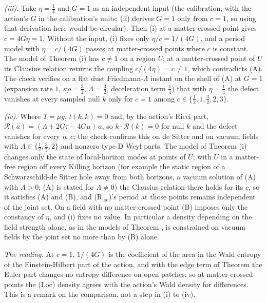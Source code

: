 \emph{(iii).} Take $\eta = \tfrac14$ and $G = 1$ as an independent input (the calibration, with the action's $G$ in the calibration's units; (ii) derives $G = 1$ only from $c = 1$, so using that derivation here would be circular). Then (i) at a matter-crossed point gives $c = 4G\eta = 1$. Without the input, (i) fixes only $\eta/c = 1/(4G)$, and a period model with $\eta = c/(4G)$ passes at matter-crossed points where $c$ is constant. The model of Theorem (i) has $c \neq 1$ on a region $U$; at a matter-crossed point of $U$ its Clausius relation returns the coupling $c/(4\eta) = c \neq 1$, which contradicts (A). The check verifies on a flat dust Friedmann-$\Lambda$ instant on the shell of (A) at $G = 1$ (expansion rate $1$, $\kappa\rho = \tfrac32$, $\Lambda = \tfrac32$, deceleration term $\tfrac14$) that with $\eta = \tfrac14$ the defect vanishes at every sampled null $k$ only for $c = 1$ among $c \in \{\tfrac12, 1, \tfrac32, 2, 3\}$.

\emph{(iv).} Where $T = \mu g$, $t(k,k) = 0$ and, by the action's Ricci part, $\mathcal{R}(a) = (\Lambda + 2G\tau - 4G\mu)\,a$, so $k \cdot \mathcal{R}(k) = 0$ for null $k$ and the defect vanishes for every $\eta$, $c$; the check confirms this on de Sitter and on vacuum fields with $\Lambda \in \{\tfrac12, \tfrac35, 2\}$ and nonzero type-D Weyl parts. The model of Theorem (i) changes only the state of local-horizon modes at points of $U$; with $U$ in a matter-free region off every Killing horizon (for example the static region of a Schwarzschild-de Sitter hole away from both horizons, a vacuum solution of (A) with $\Lambda > 0$; (A) is stated for $\Lambda \neq 0$) the Clausius relation there holds for its $c$, so it satisfies (A) and (B), and (R$_{\mathrm{loc}}$)'s period at those points remains independent of the joint set. On a field with no matter-crossed point (B) imposes only the constancy of $\eta$, and (i) fixes no value. In particular a density depending on the field strength alone, as in the models of Theorem , is constrained on vacuum fields by the joint set no more than by (B) alone.

\emph{The reading.} At $c = 1$, $1/(4G)$ is the coefficient of the area in the Wald entropy of the Einstein-Hilbert part of the action, and with the edge term of Theorem  the Euler part changes no entropy difference on open patches; so at matter-crossed points the (Loc) density agrees with the action's Wald density for differences. This is a remark on the comparison, not a step in (i) to (iv).
